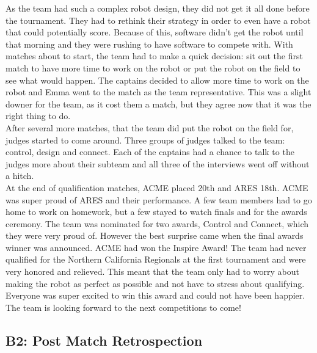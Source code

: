 \documentclass{article}
\begin{document}
As the team had such a complex robot design, they did not get it all done before the tournament. They had to rethink their strategy in order to even have a robot that could potentially score. Because of this, software didn't get the robot until that morning and they were rushing to have software to compete with. With matches about to start, the team had to make a quick decision: sit out the first match to have more time to work on the robot or put the robot on the field to see what would happen. The captains decided to allow more time to work on the robot and Emma went to the match as the team representative. This was a slight downer for the team, as it cost them a match, but they agree now that it was the right thing to do. \\

After several more matches, that the team did put the robot on the field for, judges started to come around. Three groups of judges talked to the team: control, design and connect. Each of the captains had a chance to talk to the judges more about their subteam and all three of the interviews went off without a hitch. \\

At the end of qualification matches, ACME placed 20th and ARES 18th. ACME was super proud of ARES and their performance. A few team members had to go home to work on homework, but a few stayed to watch finals and for the awards ceremony. The team was nominated for two awards, Control and Connect, which they were very proud of. However the best surprise came when the final awards winner was announced. ACME had won the Inspire Award! The team had never qualified for the Northern California Regionals at the first tournament and were very honored and relieved. This meant that the team only had to worry about making the robot as perfect as possible and not have to stress about qualifying. Everyone was super excited to win this award and could not have been happier. The team is looking forward to the next competitions to come!\\

\subsection{B2: Post Match Retrospection}
\end{document}

